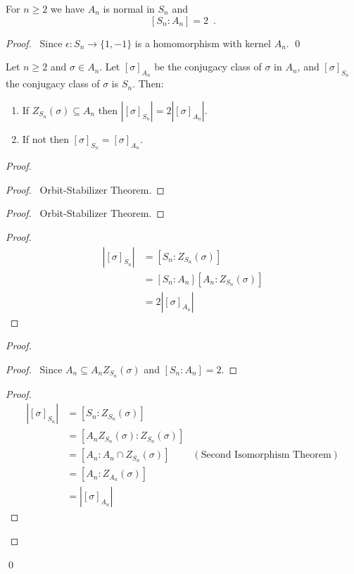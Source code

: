 \begin{prop}
For $n \geq 2$ we have
$A_n$ is normal in $S_n$ and
\[ [S_n : A_n] = 2 \enspace . \]
\end{prop}

\begin{proof}
\pf\ Since $\epsilon : S_n \rightarrow \{ 1, -1 \}$ is a homomorphism with kernel $A_n$. \qed
\end{proof}

\begin{prop}
\label{prop:size-of-sigma-An}
Let $n \geq 2$ and $\sigma \in A_n$. Let $[\sigma]_{A_n}$ be the conjugacy class of $\sigma$ in $A_n$, and $[\sigma]_{S_n}$ the conjugacy class of $\sigma$ is $S_n$. Then:
\begin{enumerate}
\item If $Z_{S_n}(\sigma) \subseteq A_n$ then $|[\sigma]_{S_n}| = 2 |[\sigma]_{A_n}|$.
\item If not then $[\sigma]_{S_n} = [\sigma]_{A_n}$.
\end{enumerate}
\end{prop}

\begin{proof}
\pf
{}
\begin{proof}
	\pf\ Orbit-Stabilizer Theorem.
\end{proof}
\begin{proof}
	\pf\ Orbit-Stabilizer Theorem.
\end{proof}
\begin{proof}
	\pf
	\begin{align*}
		|[\sigma]_{S_n}| & = [S_n : Z_{S_n}(\sigma)] \\
		& = [S_n : A_n][A_n : Z_{S_n}(\sigma)] \\
		& = 2|[\sigma]_{A_n}|
	\end{align*}
\end{proof}
\begin{proof}
	\begin{proof}
		\pf\ Since $A_n \subseteq A_n Z_{S_n}(\sigma)$ and $[S_n : A_n] = 2$.
	\end{proof}
	\begin{proof}
		\pf
		\begin{align*}
			|[\sigma]_{S_n}| & = [S_n : Z_{S_n}(\sigma)] \\
			& = [A_n Z_{S_n}(\sigma) : Z_{S_n}(\sigma)] \\
			& = [A_n : A_n \cap Z_{S_n}(\sigma)] & (\text{Second Isomorphism Theorem}) \\
			& = [A_n : Z_{A_n}(\sigma)] \\
			& = |[\sigma]_{A_n}|
		\end{align*}
	\end{proof}
\end{proof}
\qed
\end{proof}

